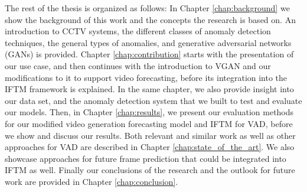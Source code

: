 The rest of the thesis is organized as follows: In Chapter \ref{chap:background} we show the background of this work and the concepts the research is based on. An introduction to CCTV systems, the different classes of anomaly detection techniques, the general types of anomalies, and generative adversarial networks (GANs) is provided. Chapter \ref{chap:contribution} starts with the presentation of our use case, and then continues with the introduction to VGAN and our modifications to it to support video forecasting, before its integration into the IFTM framework is explained. In the same chapter, we also provide insight into our data set, and the anomaly detection system that we built to test and evaluate our models. Then, in Chapter \ref{chap:results}, we present our evaluation methods for our modified video generation forecasting model and IFTM for VAD, before we show and discuss our results. Both relevant and similar work as well as other approaches for VAD are described in Chapter \ref{chap:state_of_the_art}. We also showcase approaches for future frame prediction that could be integrated into IFTM as well. Finally our conclusions of the research and the outlook for future work are provided in Chapter \ref{chap:conclusion}.